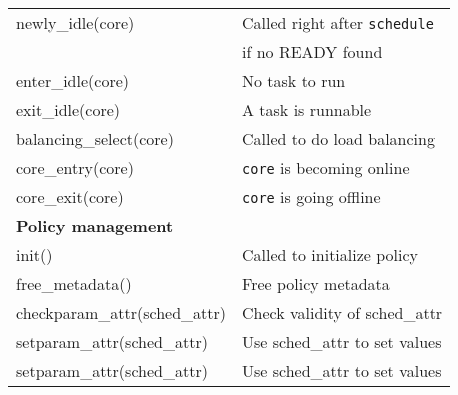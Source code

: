\begin{table}[htbp]
\begin{tabular}{|l|l|}
                newly\_idle(core) & Called right after \texttt{schedule}\\& if no READY found\\
                enter\_idle(core) & No task to run\\
                exit\_idle(core) & A task is runnable\\
                balancing\_select(core) & Called to do load balancing\\
                core\_entry(core) & \texttt{core} is becoming online\\
                core\_exit(core) & \texttt{core} is going offline\\
                \hline 

                \textbf{Policy management} & \\
                \hline
                init() & Called to initialize policy\\
                free\_metadata() & Free policy metadata\\
                checkparam\_attr(sched\_attr) & Check validity of sched\_attr\\
                setparam\_attr(sched\_attr) & Use sched\_attr to set values\\
                setparam\_attr(sched\_attr) & Use sched\_attr to set values\\
                \hline
        \end{tabular}
        
\label{tab:saakm-callbacks}
\end{table}

